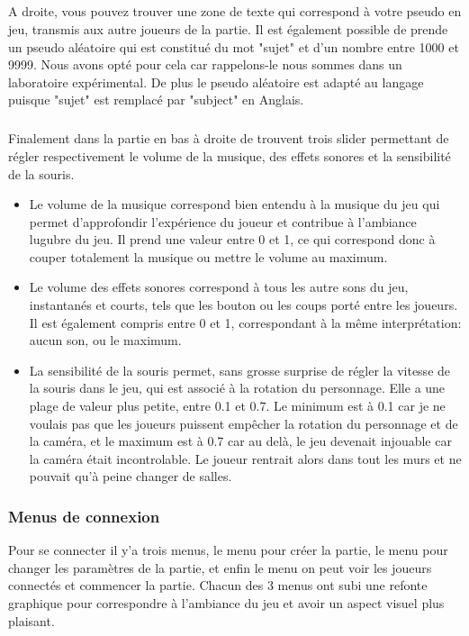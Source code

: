 \documentclass{article}
\begin{document}
\subparagraph{}
A droite, vous pouvez trouver une zone de texte qui correspond à votre pseudo en jeu, transmis aux autre joueurs de la partie. Il est également possible de prende un pseudo aléatoire qui est constitué du mot "sujet" et d'un nombre entre 1000 et 9999. Nous avons opté pour cela car rappelons-le nous sommes dans un laboratoire expérimental. De plus le pseudo aléatoire est adapté au langage puisque "sujet" est remplacé par "subject" en Anglais.

\subparagraph{}
Finalement dans la partie en bas à droite de trouvent trois slider permettant de régler respectivement le volume de la musique, des effets sonores et la sensibilité de la souris.

\begin{itemize}
	\item{Le volume de la musique} correspond bien entendu à la musique du jeu qui permet d'approfondir l'expérience du joueur et contribue à l'ambiance lugubre du jeu. Il prend une valeur entre 0 et 1, ce qui correspond donc à couper totalement la musique ou mettre le volume au maximum.
	\item{Le volume des effets sonores} correspond à tous les autre sons du jeu, instantanés et courts, tels que les bouton ou les coups porté entre les joueurs. Il est également compris entre 0 et 1, correspondant à la même interprétation: aucun son, ou le maximum.
	\item{La sensibilité de la souris} permet, sans grosse surprise de régler la vitesse de la souris dans le jeu, qui est associé à la rotation du personnage. Elle a une plage de valeur plus petite, entre 0.1 et 0.7. Le minimum est à 0.1 car je ne voulais pas que les joueurs puissent empêcher la rotation du personnage et de la caméra, et le maximum est à 0.7 car au delà, le jeu devenait injouable car la caméra était incontrolable. Le joueur rentrait alors dans tout les murs et ne pouvait qu'à peine changer de salles.
\end{itemize}

\newpage
\subsubsection{Menus de connexion}
Pour se connecter il y'a trois menus, le menu pour créer la partie, le menu pour changer les paramètres de la partie, et enfin le menu on peut voir les joueurs connectés et commencer la partie. Chacun des 3 menus ont subi une refonte graphique pour correspondre à l'ambiance du jeu et avoir un aspect visuel plus plaisant.
\end{document}
